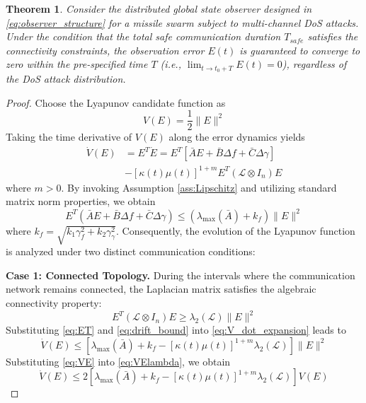 \documentclass[lettersize,journal]{IEEEtran}
\newtheorem{theorem}{Theorem}
\newtheorem{proof}{Proof}
\begin{document}
\begin{theorem}
	Consider the distributed global state observer designed in \eqref{eq:observer_structure} for a missile swarm subject to multi-channel DoS attacks. Under the condition that the total safe communication duration $T_{safe}$ satisfies the connectivity constraints, the observation error $E(t)$ is guaranteed to converge to zero within the pre-specified time $T$ (i.e., $\lim_{t \to t_0+T} E(t) = 0$), regardless of the DoS attack distribution.
\end{theorem}

\begin{proof}
	Choose the Lyapunov candidate function as
	\begin{equation}
		\label{eq:VE}
		V(E) = \frac{1}{2}\|E\|^2
	\end{equation}
	Taking the time derivative of $V(E)$ along the error dynamics yields
	\begin{equation}
		\label{eq:V_dot_expansion}
		\begin{aligned}
			\dot{V}(E) &= E^T \dot{E} = E^T \left[ \bar{A}E + \bar{B}\Delta f + \bar{C}\Delta \gamma \right] \\
			&- [\kappa(t)\mu(t)]^{1+m} E^T (\mathcal{L} \otimes I_n) E
		\end{aligned}
	\end{equation}
	where $m>0$. By invoking Assumption \ref{ass:Lipschitz} and utilizing standard matrix norm properties, we obtain
	\begin{equation}
		\label{eq:drift_bound}
		E^T (\bar{A}E + \bar{B}\Delta f + \bar{C}\Delta \gamma) \le (\lambda_{\max}(\bar{A}) + k_f) \|E\|^2
	\end{equation}
	where $k_f = \sqrt{k_1 \gamma_f^2 + k_2 \gamma_\gamma^2}$. Consequently, the evolution of the Lyapunov function is analyzed under two distinct communication conditions:
	
	\textbf{Case 1: Connected Topology.} During the intervals where the communication network remains connected, the Laplacian matrix satisfies the algebraic connectivity property:
	\begin{equation}
		\label{eq:ET}
		E^T (\mathcal{L} \otimes I_n) E \ge \lambda_2(\mathcal{L}) \|E\|^2
	\end{equation}
	Substituting \eqref{eq:ET} and \eqref{eq:drift_bound} into \eqref{eq:V_dot_expansion} leads to
	\begin{equation}
		\label{eq:VElambda}
		\dot{V}(E) \le \left[ \lambda_{\max}(\bar{A}) + k_f - [\kappa(t)\mu(t)]^{1+m} \lambda_2(\mathcal{L}) \right] \|E\|^2
	\end{equation}
	Substituting \eqref{eq:VE} into \eqref{eq:VElambda}, we obtain
	\begin{equation}
		\label{eq:V_dot_connected}
		\dot{V}(E) \le 2 \left[ \lambda_{\max}(\bar{A}) + k_f - [\kappa(t)\mu(t)]^{1+m} \lambda_2(\mathcal{L}) \right] V(E)
	\end{equation}
	

\end{proof}
\end{document}
